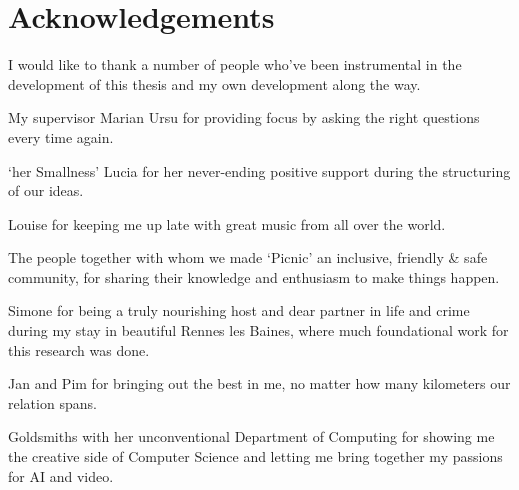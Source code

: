 \section{Acknowledgements} 
\label{sec:acknowledgements}

I would like to thank a number of people who've been instrumental in the development of this thesis and my own development along the way.

My supervisor Marian Ursu for providing focus by asking the right questions every time again.

`her Smallness' Lucia for her never-ending positive support during the structuring of our ideas.

Louise for keeping me up late with great music from all over the world.

The people together with whom we made `Picnic' an inclusive, friendly & safe community, for sharing their knowledge and enthusiasm to make things happen.

Simone for being a truly nourishing host and dear partner in life and crime during my stay in beautiful Rennes les Baines, where much foundational work for this research was done.

Jan and Pim for bringing out the best in me, no matter how many kilometers our relation spans.

Goldsmiths with her unconventional Department of Computing for showing me the creative side of Computer Science and letting me bring together my passions for AI and video.


